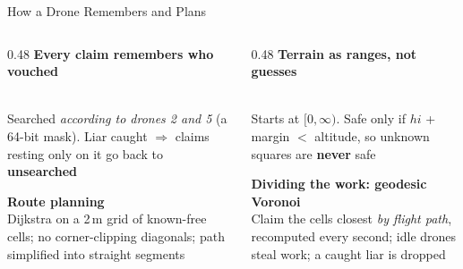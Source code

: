 \documentclass[aspectratio=169,10pt]{beamer}
\begin{document}
\begin{frame}{How a Drone Remembers and Plans}
\begin{columns}[T]
\begin{column}{0.48\textwidth}
\textbf{\color{primary}Every claim remembers who vouched}\\[0.3em]
\\[0.1em]
{\small Searched \emph{according to drones 2 and 5} (a 64-bit mask). Liar caught $\Rightarrow$ claims resting only on it go back to \textbf{unsearched}}

\vspace{0.8em}
\textbf{\color{primary}Route planning}\\[0.2em]
{\small Dijkstra on a 2\,m grid of known-free cells; no corner-clipping diagonals; path simplified into straight segments}
\end{column}
\begin{column}{0.48\textwidth}
\textbf{\color{primary}Terrain as ranges, not guesses}\\[0.3em]
\\[0.1em]
{\small Starts at $[0,\infty)$. Safe only if $\mathit{hi}$ + margin $<$ altitude, so unknown squares are \textbf{never} safe}

\vspace{0.8em}
\textbf{\color{primary}Dividing the work: geodesic Voronoi}\\[0.2em]
{\small Claim the cells closest \emph{by flight path}, recomputed every second; idle drones steal work; a caught liar is dropped}
\end{column}
\end{columns}
\end{frame}
\end{document}
